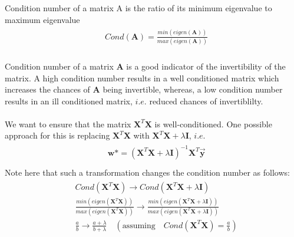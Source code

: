 \documentclass[12pt]{article}
\begin{document}
\begin{definition}
Condition number of a matrix A is the ratio of its minimum eigenvalue to maximum eigenvalue
\begin{gather}
    \begin{aligned}
        &  Cond(\boldsymbol{A})= \frac{min(eigen(\boldsymbol{A}))}{max(eigen(\boldsymbol{A}))}           \nonumber\\
    \end{aligned}
\end{gather}
\end{definition}

\noindent Condition number of a matrix \textbf{A} is a good indicator of the invertibility of the matrix. A high condition number results in a well conditioned matrix which increases the chances of \textbf{A} being invertible, whereas, a low condition number results in an ill conditioned matrix, $i.e.$ reduced chances of invertiblilty.
\\
\\
We want to ensure that the matrix $\boldsymbol{X}^T\boldsymbol{X}$ is well-conditioned. One possible approach for this is replacing $\boldsymbol{X}^T\boldsymbol{X}$ with $ \boldsymbol{X}^T\boldsymbol{X} + \lambda\boldsymbol{I}$, $i.e.$
\begin{gather}
    \begin{aligned}
        &  \boldsymbol{w}* = (\boldsymbol{X}^T\boldsymbol{X} + \lambda\boldsymbol{I})^{-1}\boldsymbol{X}^T\vec{\boldsymbol{y}}      \nonumber\\
    \end{aligned}
\end{gather}
Note here that such a transformation changes the condition number as follows:
\begin{gather}
    \begin{aligned}
        & Cond(\boldsymbol{X}^T\boldsymbol{X}) \to Cond(\boldsymbol{X}^T\boldsymbol{X} + \lambda\boldsymbol{I})    \nonumber\\
        & \frac{min(eigen(\boldsymbol{X}^T\boldsymbol{X}))}{max(eigen(\boldsymbol{X}^T\boldsymbol{X}))} \to \frac{min(eigen(\boldsymbol{X}^T\boldsymbol{X} + \lambda\boldsymbol{I}))}{max(eigen(\boldsymbol{X}^T\boldsymbol{X}+ \lambda\boldsymbol{I}))}  \nonumber \\
        & \frac{a}{b} \to \frac{a+\lambda}{b+\lambda} \quad (\text{assuming} \quad Cond(\boldsymbol{X}^T\boldsymbol{X}) = \frac{a}{b}) \nonumber \\
    \end{aligned}
\end{gather}
\end{document}
